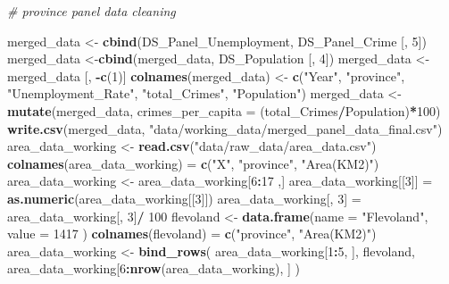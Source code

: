 \documentclass[
]{article}
\newenvironment{Shaded}{\begin{snugshade}}{\end{snugshade}}
\newcommand{\AttributeTok}[1]{\textcolor[rgb]{0.13,0.29,0.53}{#1}}
\newcommand{\CommentTok}[1]{\textcolor[rgb]{0.56,0.35,0.01}{\textit{#1}}}
\newcommand{\DecValTok}[1]{\textcolor[rgb]{0.00,0.00,0.81}{#1}}
\newcommand{\FunctionTok}[1]{\textcolor[rgb]{0.13,0.29,0.53}{\textbf{#1}}}
\newcommand{\NormalTok}[1]{#1}
\newcommand{\OtherTok}[1]{\textcolor[rgb]{0.56,0.35,0.01}{#1}}
\newcommand{\SpecialCharTok}[1]{\textcolor[rgb]{0.81,0.36,0.00}{\textbf{#1}}}
\newcommand{\StringTok}[1]{\textcolor[rgb]{0.31,0.60,0.02}{#1}}
\begin{document}
\begin{Shaded}
\begin{Highlighting}[]
\CommentTok{\# province panel data cleaning}

\NormalTok{merged\_data }\OtherTok{\textless{}{-}} \FunctionTok{cbind}\NormalTok{(DS\_Panel\_Unemployment, DS\_Panel\_Crime [, }\DecValTok{5}\NormalTok{])}
\NormalTok{merged\_data }\OtherTok{\textless{}{-}}\FunctionTok{cbind}\NormalTok{(merged\_data, DS\_Population [, }\DecValTok{4}\NormalTok{])}
\NormalTok{merged\_data }\OtherTok{\textless{}{-}}\NormalTok{ merged\_data [, }\SpecialCharTok{{-}}\FunctionTok{c}\NormalTok{(}\DecValTok{1}\NormalTok{)] }
\FunctionTok{colnames}\NormalTok{(merged\_data) }\OtherTok{\textless{}{-}} \FunctionTok{c}\NormalTok{(}\StringTok{"Year"}\NormalTok{, }\StringTok{"province"}\NormalTok{, }\StringTok{"Unemployment\_Rate"}\NormalTok{, }\StringTok{"total\_Crimes"}\NormalTok{, }\StringTok{"Population"}\NormalTok{)}
\NormalTok{merged\_data }\OtherTok{\textless{}{-}} \FunctionTok{mutate}\NormalTok{(merged\_data, }\AttributeTok{crimes\_per\_capita =}\NormalTok{ (total\_Crimes}\SpecialCharTok{/}\NormalTok{Population)}\SpecialCharTok{*}\DecValTok{100}\NormalTok{)}
\FunctionTok{write.csv}\NormalTok{(merged\_data, }\StringTok{"data/working\_data/merged\_panel\_data\_final.csv"}\NormalTok{)}
\NormalTok{area\_data\_working }\OtherTok{\textless{}{-}} \FunctionTok{read.csv}\NormalTok{(}\StringTok{"data/raw\_data/area\_data.csv"}\NormalTok{)}
\FunctionTok{colnames}\NormalTok{(area\_data\_working) }\OtherTok{=} \FunctionTok{c}\NormalTok{(}\StringTok{"X"}\NormalTok{, }\StringTok{"province"}\NormalTok{, }\StringTok{"Area(KM2)"}\NormalTok{)}
\NormalTok{area\_data\_working }\OtherTok{\textless{}{-}}\NormalTok{ area\_data\_working[}\DecValTok{6}\SpecialCharTok{:}\DecValTok{17}\NormalTok{ ,]}
\NormalTok{area\_data\_working[[}\DecValTok{3}\NormalTok{]]  }\OtherTok{=} \FunctionTok{as.numeric}\NormalTok{(area\_data\_working[[}\DecValTok{3}\NormalTok{]])}
\NormalTok{area\_data\_working[, }\DecValTok{3}\NormalTok{] }\OtherTok{=}\NormalTok{ area\_data\_working[, }\DecValTok{3}\NormalTok{]}\SpecialCharTok{/} \DecValTok{100}
\NormalTok{flevoland }\OtherTok{\textless{}{-}} \FunctionTok{data.frame}\NormalTok{(}\AttributeTok{name =} \StringTok{"Flevoland"}\NormalTok{, }\AttributeTok{value =} \DecValTok{1417}\NormalTok{ )}
\FunctionTok{colnames}\NormalTok{(flevoland) }\OtherTok{=} \FunctionTok{c}\NormalTok{(}\StringTok{"province"}\NormalTok{, }\StringTok{"Area(KM2)"}\NormalTok{)}
\NormalTok{area\_data\_working }\OtherTok{\textless{}{-}} \FunctionTok{bind\_rows}\NormalTok{(}
\NormalTok{  area\_data\_working[}\DecValTok{1}\SpecialCharTok{:}\DecValTok{5}\NormalTok{, ], flevoland,  }
\NormalTok{  area\_data\_working[}\DecValTok{6}\SpecialCharTok{:}\FunctionTok{nrow}\NormalTok{(area\_data\_working), ]}
\NormalTok{)}
\end{Highlighting}
\end{Shaded}
\end{document}
